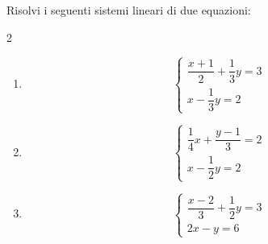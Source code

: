 
\begin{question}[ID=2.2, subtitle={Sistemi con frazioni e numeratori letterali}, difficulty=media, tags={sistemi, equazioni lineari, frazioni}]
Risolvi i seguenti sistemi lineari di due equazioni:
\begin{multicols}{2}
\begin{enumerate}[leftmargin=3.2cm]
    \item
    \[
    \begin{cases}
    \dfrac{x+1}{2}+\dfrac{1}{3}y=3\\
    x-\dfrac{1}{3}y=2
    \end{cases}
    \]

    \item
    \[
    \begin{cases}
    \dfrac{1}{4}x+\dfrac{y-1}{3}=2\\
    x-\dfrac{1}{2}y=2
    \end{cases}
    \]

    \item
    \[
    \begin{cases}
    \dfrac{x-2}{3}+\dfrac{1}{2}y=3\\
    2x-y=6
    \end{cases}
    \]


\end{enumerate}
\end{multicols}
\end{question}
